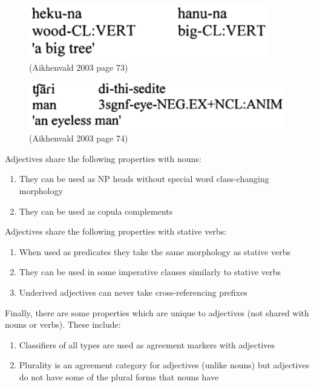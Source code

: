 \documentclass{article}
\begin{document}
\begin{figure}[h!]
\centering
\includegraphics[scale = 0.38]{bigtree.png}
	\caption{(Aikhenvald 2003 page 73)}
	\label{bigtree}
\end{figure}

\begin{figure}[h!]
\centering
\includegraphics[scale = 0.38]{eyelessman.png}
	\caption{(Aikhenvald 2003 page 74)}
	\label{eyelessman}
\end{figure}


\noindent Adjectives share the following properties with nouns:
\begin{enumerate}
  \item They can be used as NP heads without special word class-changing morphology
  \item They can be used as copula complements %
\end{enumerate}

\noindent Adjectives share the following properties with stative verbs:
\begin{enumerate}
  \item When used as predicates they take the same morphology as stative verbs
  \item They can be used in some imperative clauses similarly to stative verbs
  \item Underived adjectives can never take cross-referencing prefixes
\end{enumerate}

\noindent Finally, there are some properties which are unique to adjectives (not shared with nouns or verbs). These include:
\begin{enumerate}
  \item Classifiers of all types are used as agreement markers with adjectives
  \item Plurality is an agreement category for adjectives (unlike nouns) but adjectives do not have some of the plural forms that nouns have
\end{enumerate}
\end{document}
